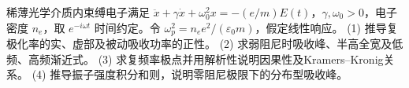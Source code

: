 稀薄光学介质内束缚电子满足 \(\ddot x+\gamma\dot x+\omega_0^2x=-(e/m)E(t)\)，\(\gamma,\omega_0>0\)，电子密度 \(n_e\)，取 \(e^{-i\omega t}\) 时间约定。令 \(\omega_p^2=n_ee^2/(\varepsilon_0m)\)，假定线性响应。
(1) 推导复极化率的实、虚部及被动吸收功率的正性。
(2) 求弱阻尼时吸收峰、半高全宽及低频、高频渐近式。
(3) 求复频率极点并用解析性说明因果性及Kramers–Kronig关系。
(4) 推导振子强度积分和则，说明零阻尼极限下的分布型吸收峰。
